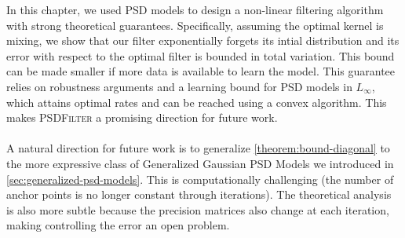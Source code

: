 In this chapter, we used PSD models to design a non-linear filtering algorithm with strong theoretical guarantees. Specifically, assuming the optimal kernel is mixing, we show that our filter exponentially forgets its intial distribution and its error with respect to the optimal filter is bounded in total variation. This bound can be made smaller if more data is available to learn the model. This guarantee relies on robustness arguments and a learning bound for PSD models in $L_\infty$, which attains optimal rates and can be reached using a convex algorithm. This makes \textsc{PSDFilter} a promising direction for future work.

\paragraph{}
A natural direction for future work is to generalize \cref{theorem:bound-diagonal} to the more expressive class of Generalized Gaussian PSD Models we introduced in \cref{sec:generalized-psd-models}. This is computationally challenging (the number of anchor points is no longer constant through iterations). The theoretical analysis is also more subtle because the precision matrices also change at each iteration, making controlling the error an open problem.
